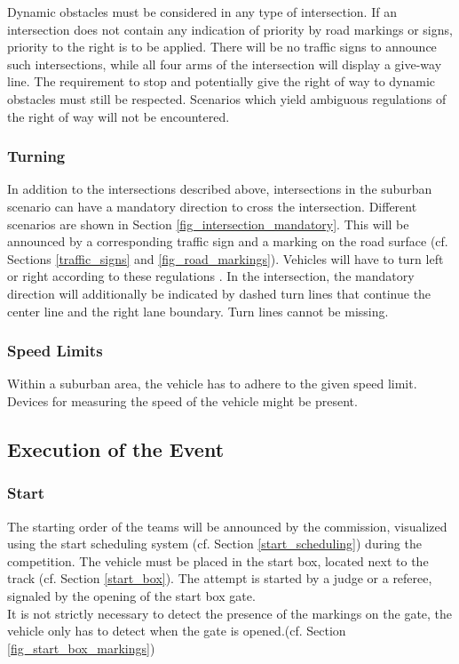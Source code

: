 Dynamic obstacles must be considered in any type of intersection. If an
intersection does not contain any indication of priority by road markings or
signs, priority to the right is to be applied. There will be no traffic signs
to announce such intersections, while all four arms of the intersection will
display a give-way line. The requirement to stop and potentially give the right
of way to dynamic obstacles must still be respected. Scenarios which yield
ambiguous regulations of the right of way will not be encountered.

\subsubsection{Turning}
\label{turning}

In addition to the intersections described above, intersections in the suburban
scenario can have a mandatory direction to cross the intersection. Different
scenarios are shown in Section \ref{fig_intersection_mandatory}. This will be
announced by a corresponding traffic sign and a marking on the road surface
(cf. Sections \ref{traffic_signs} and \ref{fig_road_markings}). Vehicles will
have to turn left or right according to these regulations . In the intersection, the
mandatory direction will additionally be indicated by dashed turn lines that
continue the center line and the right lane boundary. Turn lines cannot be
missing.

\subsubsection{Speed Limits}

Within a suburban area, the vehicle has to adhere to the given speed limit.
Devices for measuring the speed of the vehicle might be present.

\subsection{Execution of the Event}

\subsubsection{Start}

The starting order of the teams will be announced by the commission, visualized
using the start scheduling system (cf. Section \ref{start_scheduling}) during
the competition. The vehicle must be placed in the start box, located next to
the track (cf. Section \ref{start_box}). The attempt is started by a judge or a
referee, signaled by the opening of the start box gate.\\ It is not strictly
necessary to detect the presence of the markings on the gate, the vehicle only
has to detect when the gate is opened.(cf. Section
\ref{fig_start_box_markings})

